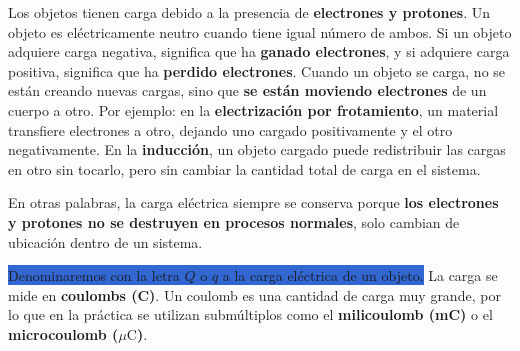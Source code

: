 Los objetos tienen carga debido a la presencia de \textbf{electrones y protones}. Un objeto es eléctricamente neutro cuando tiene igual número de ambos. Si un objeto adquiere carga negativa, significa que ha \textbf{ganado electrones}, y si adquiere carga positiva, significa que ha \textbf{perdido electrones}. Cuando un objeto se carga, no se están creando nuevas cargas, sino que \textbf{se están moviendo electrones} de un cuerpo a otro. Por ejemplo: en la \textbf{electrización por frotamiento}, un material transfiere electrones a otro, dejando uno cargado positivamente y el otro negativamente. En la \textbf{inducción}, un objeto cargado puede redistribuir las cargas en otro sin tocarlo, pero sin cambiar la cantidad total de carga en el sistema.

En otras palabras, la carga eléctrica siempre se conserva porque \textbf{los electrones y protones no se destruyen en procesos normales}, solo cambian de ubicación dentro de un sistema.

\colorbox{highlight}{Denominaremos con la letra \( Q \) o \( q \) a la carga eléctrica de un objeto.} La carga se mide en \textbf{coulombs (C)}. Un coulomb es una cantidad de carga muy grande, por lo que en la práctica se utilizan submúltiplos como el \textbf{milicoulomb (mC)} o el \textbf{microcoulomb (\( \mu \text{C} \))}.